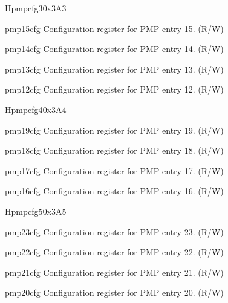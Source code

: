 \begin{register}{H}{pmpcfg3}{0x3A3}
\label{regdesc:pmpcfg3}%
%
%
%
%
\regnewline%
\begin{regdesc}
\begin{reglist}
\label{fielddesc:pmp15cfg}\item [pmp15cfg] Configuration register for PMP entry 15. (R/W)
\label{fielddesc:pmp14cfg}\item [pmp14cfg] Configuration register for PMP entry 14. (R/W)
\label{fielddesc:pmp13cfg}\item [pmp13cfg] Configuration register for PMP entry 13. (R/W)
\label{fielddesc:pmp12cfg}\item [pmp12cfg] Configuration register for PMP entry 12. (R/W)
\end{reglist}
\end{regdesc}
\end{register}

\begin{register}{H}{pmpcfg4}{0x3A4}
\label{regdesc:pmpcfg4}%
%
%
%
%
\regnewline%
\begin{regdesc}
\begin{reglist}
\label{fielddesc:pmp19cfg}\item [pmp19cfg] Configuration register for PMP entry 19. (R/W)
\label{fielddesc:pmp18cfg}\item [pmp18cfg] Configuration register for PMP entry 18. (R/W)
\label{fielddesc:pmp17cfg}\item [pmp17cfg] Configuration register for PMP entry 17. (R/W)
\label{fielddesc:pmp16cfg}\item [pmp16cfg] Configuration register for PMP entry 16. (R/W)
\end{reglist}
\end{regdesc}
\end{register}

\begin{register}{H}{pmpcfg5}{0x3A5}
\label{regdesc:pmpcfg5}%
%
%
%
%
\regnewline%
\begin{regdesc}
\begin{reglist}
\label{fielddesc:pmp23cfg}\item [pmp23cfg] Configuration register for PMP entry 23. (R/W)
\label{fielddesc:pmp22cfg}\item [pmp22cfg] Configuration register for PMP entry 22. (R/W)
\label{fielddesc:pmp21cfg}\item [pmp21cfg] Configuration register for PMP entry 21. (R/W)
\label{fielddesc:pmp20cfg}\item [pmp20cfg] Configuration register for PMP entry 20. (R/W)
\end{reglist}
\end{regdesc}
\end{register}

